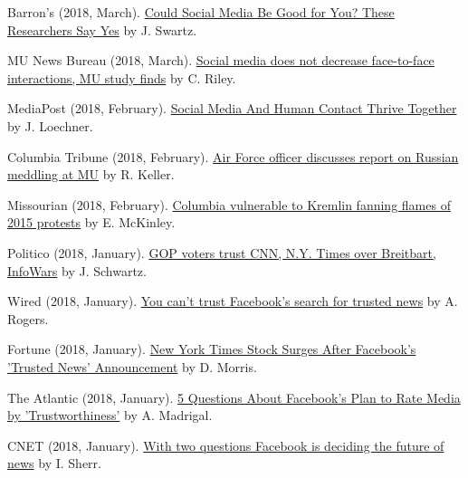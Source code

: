 \begin{bibenum}
    \item[] Barron's (2018, March).
      \href{https://www.barrons.com/articles/could-social-media-be-good-for-you-these-researchers-say-yes-1519932207}{Could Social Media Be Good for You? These Researchers Say Yes} by J. Swartz.
    \item[] MU News Bureau (2018, March).
      \href{https://munews.missouri.edu/news-releases/2018/0301-social-media-does-not-decrease-face-to-face-interactions-mu-study-finds/}{Social media does not decrease face-to-face interactions, MU study finds} by C. Riley.
    \item[] MediaPost (2018, February).
      \href{https://mediapost.com/publications/article/315106/social-media-and-human-contact-thrive-together.html}{Social Media And Human Contact Thrive Together} by J. Loechner.
    \item[] Columbia Tribune (2018, February).
      \href{http://www.columbiatribune.com/news/20180217/air-force-officer-discusses-report-on-russian-meddling-at-mu}{Air Force officer discusses report on Russian meddling at MU} by R. Keller.
    \item[] Missourian (2018, February).
      \href{https://www.columbiamissourian.com/news/higher_education/columbia-vulnerable-to-kremlin-fanning-flames-of-protests/article_929cf366-11ad-11e8-9631-63ac0b4a6fd3.html}{Columbia vulnerable to Kremlin fanning flames of 2015 protests} by E. McKinley.
    \item[] Politico (2018, January).
      \href{https://www.politico.com/amp/story/2018/02/06/gop-republican-voters-media-bias-trusted-sites-393650}{ GOP voters trust CNN, N.Y. Times over Breitbart, InfoWars} by J. Schwartz.
    \item[] Wired (2018, January).
      \href{https://www.wired.com/story/you-cant-trust-facebooks-search-for-trusted-news/}{You can't trust Facebook's search for trusted news} by A. Rogers.
    \item[] Fortune (2018, January).
      \href{http://fortune.com/2018/01/21/new-york-times-stock-facebooks-trusted-news/}{New York Times Stock Surges After Facebook's 'Trusted News' Announcement} by D. Morris.
    \item[] The Atlantic (2018, January).
      \href{https://www.theatlantic.com/technology/archive/2018/01/facebook-media-trustworthiness/551045/}{5 Questions About Facebook's Plan to Rate Media by 'Trustworthiness'} by A. Madrigal.
    \item[] CNET (2018, January).
      \href{https://www.cnet.com/news/with-two-questions-facebook-is-deciding-the-future-of-news-zuckerberg-fake-news/}{With two questions Facebook is deciding the future of news} by I. Sherr.

\end{bibenum}
